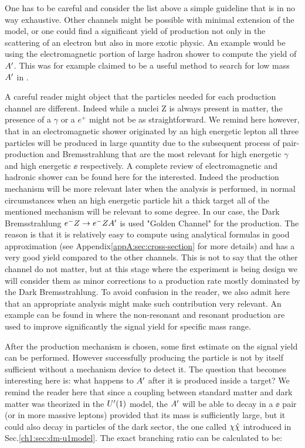 One has to be careful and consider the list above a simple guideline that is in no way exhaustive. Other channels might be possible with minimal extension of the model, or one could find a significant yield of production not only in the scattering of an electron but also in more exotic physic. An example would be using the electromagnetic portion of large hadron shower to compute the yield of $A'$. This was for example claimed to be a useful method to search for low mass $A'$ in \cite{Celentano:2020vtu}.

A careful reader might object that the particles needed for each production channel are different. Indeed while a nuclei Z is always present in matter, the presence of a $\gamma$ or a $e^+$ might not be as straightforward. We remind here however, that in an electromagnetic shower originated by an high energetic lepton all three particles will be produced in large quantity due to the subsequent process of pair-production and Bremsstrahlung that are the most relevant for high energetic $\gamma$ and high energetic $\ee$ respectively. A complete review of electromagnetic and hadronic shower can be found here \cite{Bichsel:2002cf} for the interested. Indeed the production mechanism will be more relevant later when the analysis is performed, in normal circumstances when an high energetic particle hit a thick target all of the mentioned mechanism will be relevant to some degree. In our case, the Dark Bremsstrahlung $e^- Z \to e^- Z A'$ is used "Golden Channel" for the production. The reason is that it is relatively easy to compute using analytical formulas in good approximation (see Appendix\ref{appA:sec:cross-section} for more details) and has a very good yield compared to the other channels. This is not to say that the other channel do not matter, but at this stage where the experiment is being design we will consider them as minor corrections to a production rate mostly dominated by the Dark Bremsstrahlung. To avoid confusion in the reader, we also admit here that an appropriate analysis might make such contribution very relevant. An example can be found in \cite{Marsicano_2018} where the non-resonant and resonant production are used to improve significantly the signal yield for specific mass range.

After the production mechanism is chosen, some first estimate on the signal yield can be performed. However successfully producing the particle is not by itself sufficient without a mechanism device to detect it. The question that becomes interesting here is: what happens to $A'$ after it is produced inside a target? We remind the reader here that since a coupling between standard matter and dark matter was theorized in the $U'(1)$ model, the $A'$ will be able to decay in a $\ee$ pair (or in more massive leptons) provided that its mass is sufficiently large, but it could also decay in particles of the dark sector, the one called $\chi \hat{\chi}$ introduced in Sec.\ref{ch1:sec:dm-u1model}. The exact branching ratio can be calculated to be:

